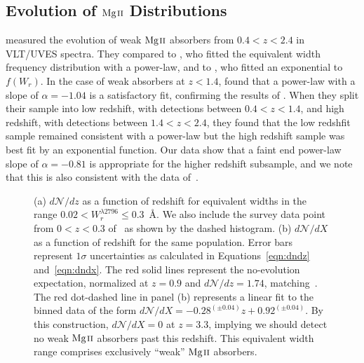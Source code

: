 \documentclass[iop,apj,numberedappendix,appendixfloats,twocolappendix]{emulateapj}
\begin{document}
\subsection{Evolution of ${\hbox{{\rm Mg}\kern 0.1em{\sc ii}}}$ Distributions}
\label{sec:evolution}

\cite{Narayanan2007} measured the evolution of weak ${\hbox{{\rm Mg}\kern 0.1em{\sc ii}}}$ absorbers from $0.4 < z < 2.4$ in VLT/UVES spectra. They compared to \cite{Churchill1999}, who fitted the equivalent width frequency distribution with a power-law, and to \cite{Nestor2005}, who fitted an exponential to $f(W_r)$. In the case of weak absorbers at $z < 1.4$, \cite{Narayanan2007} found that a power-law with a slope of $\alpha = -1.04$ is a satisfactory fit, confirming the results of \cite{Churchill1999}. When they split their sample into low redshift, with detections between $0.4 < z < 1.4$, and high redshift, with detections between $1.4 < z < 2.4$, they found that the low redshfit sample remained consistent with a power-law but the high redshift sample was best fit by an exponential function. Our data show that a faint end power-law slope of $\alpha = -0.81$ is appropriate for the higher redshift subsample, and we note that this is also consistent with the data of~\cite{Narayanan2007}.

\begin{figure}[bth]
\caption{(a) $d\mathcal{N}\!/dz$ as a function of redshift for equivalent widths in the range $0.02 < W_{r}^{\lambda2796} \le 0.3$~{\AA}. We also include the survey data point from $0 < z < 0.3$ of~\cite{Narayanan2005} as shown by the dashed histogram. (b) $d\mathcal{N}\!/dX$ as a function of redshift for the same population. Error bars represent $1\sigma$ uncertainties as calculated in Equations~\ref{eqn:dndz} and~\ref{eqn:dndx}. The red solid lines represent the no-evolution expectation, normalized at $z = 0.9$ and $d\mathcal{N}\!/dz = 1.74$, matching~\cite{Narayanan2007}. The red dot-dashed line in panel (b) represents a linear fit to the binned data of the form $d\mathcal{N}\!/dX = -0.28^{(\pm0.04)}z + 0.92^{(\pm0.04)}$. By this construction, $d\mathcal{N}\!/dX = 0$ at $z = 3.3$, implying we should detect no weak ${\hbox{{\rm Mg}\kern 0.1em{\sc ii}}}$ absorbers past this redshift. This equivalent width range comprises exclusively ``weak'' ${\hbox{{\rm Mg}\kern 0.1em{\sc ii}}}$ absorbers.}
\label{fig:dndzbetween}
\end{figure}
\end{document}
